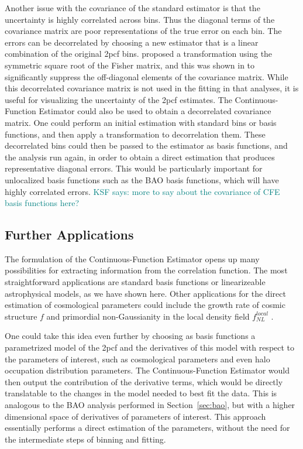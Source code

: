 \documentclass[modern]{aastex62}
\newcommand{\cf}{2pcf\xspace} %
\newcommand{\Est}{The Continuous-Function Estimator\xspace}
\newcommand{\est}{the Continuous-Function Estimator\xspace}
\newcommand{\KSF}[1]{\textcolor{teal}{KSF says: #1}}
\begin{document}
Another issue with the covariance of the standard estimator is that the uncertainty is highly correlated across bins.
Thus the diagonal terms of the covariance matrix are poor representations of the true error on each bin.
The errors can be decorrelated by choosing a new estimator that is a linear combination of the original \cf bins. 
\cite{Hamilton2000} proposed a transformation using the symmetric square root of the Fisher matrix, and this was shown in \cite{Anderson2014} to significantly suppress the off-diagonal elements of the covariance matrix.
While this decorrelated covariance matrix is not used in the fitting in that analyses, it is useful for visualizing the uncertainty of the \cf estimates.
\Est could also be used to obtain a decorrelated covariance matrix.
One could perform an initial estimation with standard bins or basis functions, and then apply a transformation to decorrelation them.
These decorrelated bins could then be passed to the estimator as basis functions, and the analysis run again, in order to obtain a direct estimation that produces representative diagonal errors.
This would be particularly important for unlocalized basis functions such as the BAO basis functions, which will have highly correlated errors.
\KSF{more to say about the covariance of CFE basis functions here?}

\subsection{Further Applications}
\label{sec:applications}

The formulation of \est opens up many possibilities for extracting information from the correlation function.
The most straightforward applications are standard basis functions or linearizeable astrophysical models, as we have shown here.
Other applications for the direct estimation of cosmological parameters could include the growth rate of cosmic structure $f$ \citep{Satpathy2016, Reid2018} and primordial non-Gaussianity in the local density field $f^{local}_{NL}$ \citep{Karagiannis2014}.

One could take this idea even further by choosing as basis functions a parametrized model of the \cf and the derivatives of this model with respect to the parameters of interest, such as cosmological parameters and even halo occupation distribution parameters.
\Est would then output the contribution of the derivative terms, which would be directly translatable to the changes in the  model needed to best fit the data.
This is analogous to the BAO analysis performed in Section~\ref{sec:bao}, but with a higher dimensional space of derivatives of parameters of interest.
This approach essentially performs a direct estimation of the parameters, without the need for the intermediate steps of binning and fitting.
\end{document}
